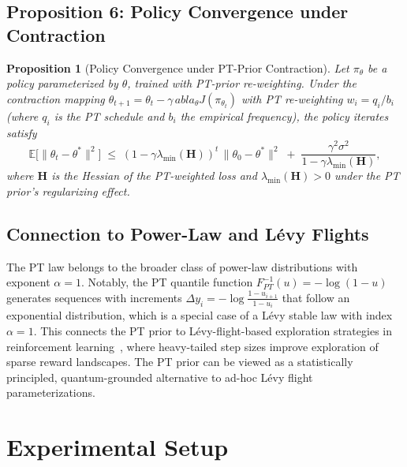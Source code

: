 \documentclass[10pt]{article}
\newtheorem{prop}{Proposition}
\newcommand{\E}{\mathbb{E}}
\begin{document}
\subsection{Proposition 6: Policy Convergence under Contraction}
\label{sec:prop6}

\begin{prop}[Policy Convergence under PT-Prior Contraction]
  Let $\pi_\theta$ be a policy parameterized by $\theta$, trained with PT-prior
  re-weighting.  Under the contraction mapping
  $\theta_{t+1} = \theta_t - \gamma\,abla_\theta J(\pi_{\theta_t})$ with PT re-weighting
  $w_i = q_i/b_i$ (where $q_i$ is the PT schedule and $b_i$ the empirical frequency),
  the policy iterates satisfy
  \[
    \E\big[\|\theta_t - \theta^\ast\|^2\big]
    \;\le\; (1 - \gamma\lambda_{\min}(\mathbf{H}))^t\,
           \|\theta_0 - \theta^\ast\|^2
           \;+\; \frac{\gamma^2\sigma^2}{1-\gamma\lambda_{\min}(\mathbf{H})},
  \]
  where $\mathbf{H}$ is the Hessian of the PT-weighted loss and
  $\lambda_{\min}(\mathbf{H})>0$ under the PT prior's regularizing effect.
  \label{prop:convergence}
\end{prop}

\subsection{Connection to Power-Law and L\'evy Flights}
\label{sec:levy}

The PT law belongs to the broader class of power-law distributions with exponent $\alpha=1$.
Notably, the PT quantile function $F_{PT}^{-1}(u)=-\log(1-u)$ generates sequences with
increments $\Delta y_i = -\log\frac{1-u_{i+1}}{1-u_i}$ that follow an exponential
distribution, which is a special case of a L\'evy stable law with index $\alpha=1$.
This connects the PT prior to L\'evy-flight-based exploration strategies in
reinforcement learning~\citep{payette2019levy,niro:2024levy}, where heavy-tailed step
sizes improve exploration of sparse reward landscapes.  The PT prior can be viewed as
a statistically principled, quantum-grounded alternative to ad-hoc L\'evy flight
parameterizations.

\section{Experimental Setup}
\label{sec:setup}
\end{document}
